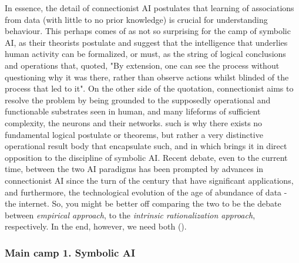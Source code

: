 In essence, the detail of connectionist AI postulates that learning of associations from data (with little to no prior knowledge) is crucial for understanding behaviour. This perhaps comes of as not so surprising for the camp of symbolic AI, as their theorists postulate and suggest that the intelligence that underlies human activity can be formalized, or must, as the string of logical conclusions and operations that, quoted, "By extension, one can see the process without questioning why it was there, rather than observe actions whilst blinded of the process that led to it". On the other side of the quotation, connectionist aims to resolve the problem by being grounded to the supposedly operational and functionable substrates seen in human, and many lifeforms of sufficient complexity, the neurons and their networks. such is why there exists no fundamental logical postulate or theorems, but rather a very distinctive operational result body that encapsulate such, and in which brings it in direct opposition to the discipline of symbolic AI. Recent debate, even to the current time, between the two AI paradigms has been prompted by advances in connectionist AI since the turn of the century that have significant applications, and furthermore, the technological evolution of the age of abundance of data - the internet. So, you might be better off comparing the two to be the debate between \textit{empirical approach}, to the \textit{intrinsic rationalization approach}, respectively. In the end, however, we need both (\cite{Goel_2022}). 

\subsubsection{Main camp 1. Symbolic AI}

